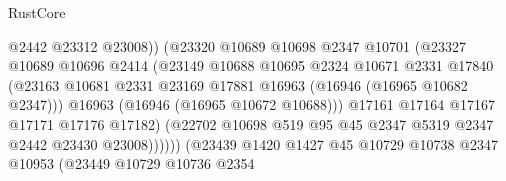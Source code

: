 \begin{lexlean}{RustCore}
\begin{coremodule}
                                        @2442
                                        @23312
                                        @23008))
                                    (@23320
                                      @10689
                                      @10698
                                      @2347
                                      @10701
                                      (@23327
                                        @10689
                                        @10696
                                        @2414
                                        (@23149
                                          @10688
                                          @10695
                                          @2324
                                          @10671
                                          @2331
                                          @17840
                                          (@23163
                                            @10681
                                            @2331
                                            @23169
                                            @17881
                                            @16963
                                            (@16946 (@16965 @10682 @2347)))
                                          @16963
                                          (@16946 (@16965 @10672 @10688)))
                                        @17161
                                        @17164
                                        @17167
                                        @17171
                                        @17176
                                        @17182)
                                      (@22702
                                        @10698
                                        @519
                                        @95
                                        @45
                                        @2347
                                        @5319
                                        @2347
                                        @2442
                                        @23430
                                        @23008))))))
                            (@23439
                              @1420
                              @1427
                              @45
                              @10729
                              @10738
                              @2347
                              @10953
                              (@23449
                                @10729
                                @10736
                                @2354

\end{coremodule}
\end{lexlean}
